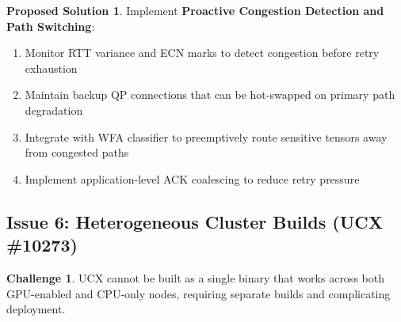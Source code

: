 \documentclass[11pt,letterpaper]{article}
\theoremstyle{definition}
\newtheorem{challenge}{Challenge}
\newtheorem{solution}{Proposed Solution}
\begin{document}
\begin{solution}
Implement \textbf{Proactive Congestion Detection and Path Switching}:
\begin{enumerate}
    \item Monitor RTT variance and ECN marks to detect congestion before retry exhaustion
    \item Maintain backup QP connections that can be hot-swapped on primary path degradation
    \item Integrate with WFA classifier to preemptively route sensitive tensors away from congested paths
    \item Implement application-level ACK coalescing to reduce retry pressure
\end{enumerate}
\end{solution}

\subsection{Issue 6: Heterogeneous Cluster Builds (UCX \#10273)}

\begin{challenge}
UCX cannot be built as a single binary that works across both GPU-enabled and CPU-only nodes, requiring separate builds and complicating deployment.
\end{challenge}
\end{document}
